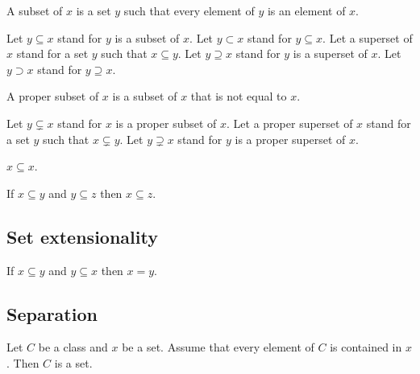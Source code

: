 \documentclass[../../sets-and-functions.ftl.tex]{subfiles}
\begin{document}
  \begin{forthel}
    \begin{definition}
      A subset of $x$ is a set $y$ such that every element of $y$ is an element of $x$.
    \end{definition}

    Let $y \subseteq x$ stand for $y$ is a subset of $x$.
    Let $y \subset x$ stand for $y \subseteq x$.
    Let a superset of $x$ stand for a set $y$ such that $x \subseteq y$.
    Let $y \supseteq x$ stand for $y$ is a superset of $x$.
    Let $y \supset x$ stand for $y \supseteq x$.

    \begin{definition}
      A proper subset of $x$ is a subset of $x$ that is not equal to $x$.
    \end{definition}

    Let $y \subsetneq x$ stand for $x$ is a proper subset of $x$.
    Let a proper superset of $x$ stand for a set $y$ such that $x \subsetneq y$.
    Let $y \supsetneq x$ stand for $y$ is a proper superset of $x$.

    \begin{proposition}[SF 01 01  375611]
      $x \subseteq x$.
    \end{proposition}

    \begin{proposition}[SF 01 01  726162]
      If $x \subseteq y$ and $y \subseteq z$ then $x \subseteq z$.
    \end{proposition}
  \end{forthel}


  \subsection{Set extensionality}

  \begin{forthel}
    \begin{axiom}
      If $x \subseteq y$ and $y \subseteq x$ then $x = y$.
    \end{axiom}
  \end{forthel}


  \subsection{Separation}

  \begin{forthel}
    \begin{axiom}[Separation]
      Let $C$ be a class and $x$ be a set.
      Assume that every element of $C$ is contained in $x$.
      Then $C$ is a set.
    \end{axiom}
  \end{forthel}
\end{document}

